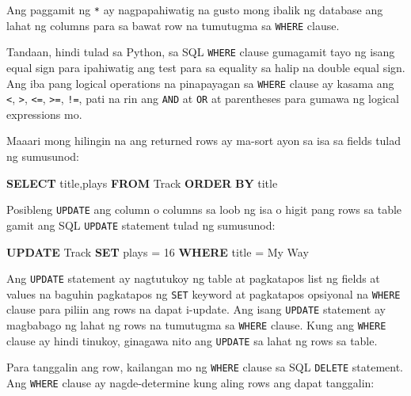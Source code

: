 \documentclass[10pt,]{book}
\newenvironment{Shaded}{}{}
\newcommand{\DecValTok}[1]{\textcolor[rgb]{0.25,0.63,0.44}{#1}}
\newcommand{\KeywordTok}[1]{\textcolor[rgb]{0.00,0.44,0.13}{\textbf{#1}}}
\newcommand{\NormalTok}[1]{#1}
\newcommand{\OperatorTok}[1]{\textcolor[rgb]{0.40,0.40,0.40}{#1}}
\newcommand{\StringTok}[1]{\textcolor[rgb]{0.25,0.44,0.63}{#1}}
\begin{document}
Ang paggamit ng \texttt{*} ay nagpapahiwatig na gusto mong ibalik ng
database ang lahat ng columns para sa bawat row na tumutugma sa
\texttt{WHERE} clause.

Tandaan, hindi tulad sa Python, sa SQL \texttt{WHERE} clause gumagamit
tayo ng isang equal sign para ipahiwatig ang test para sa equality sa
halip na double equal sign. Ang iba pang logical operations na
pinapayagan sa \texttt{WHERE} clause ay kasama ang \texttt{\textless{}},
\texttt{\textgreater{}}, \texttt{\textless{}=},
\texttt{\textgreater{}=}, \texttt{!=}, pati na rin ang \texttt{AND} at
\texttt{OR} at parentheses para gumawa ng logical expressions mo.

Maaari mong hilingin na ang returned rows ay ma-sort ayon sa isa sa
fields tulad ng sumusunod:

\begin{Shaded}
\begin{Highlighting}[]
\KeywordTok{SELECT}\NormalTok{ title,plays }\KeywordTok{FROM}\NormalTok{ Track }\KeywordTok{ORDER} \KeywordTok{BY}\NormalTok{ title}
\end{Highlighting}
\end{Shaded}

Posibleng \texttt{UPDATE} ang column o columns sa loob ng isa o higit
pang rows sa table gamit ang SQL \texttt{UPDATE} statement tulad ng
sumusunod:

\begin{Shaded}
\begin{Highlighting}[]
\KeywordTok{UPDATE}\NormalTok{ Track }\KeywordTok{SET}\NormalTok{ plays }\OperatorTok{=} \DecValTok{16} \KeywordTok{WHERE}\NormalTok{ title }\OperatorTok{=} \StringTok{\textquotesingle{}My Way\textquotesingle{}}
\end{Highlighting}
\end{Shaded}

Ang \texttt{UPDATE} statement ay nagtutukoy ng table at pagkatapos list
ng fields at values na baguhin pagkatapos ng \texttt{SET} keyword at
pagkatapos opsiyonal na \texttt{WHERE} clause para piliin ang rows na
dapat i-update. Ang isang \texttt{UPDATE} statement ay magbabago ng
lahat ng rows na tumutugma sa \texttt{WHERE} clause. Kung ang
\texttt{WHERE} clause ay hindi tinukoy, ginagawa nito ang
\texttt{UPDATE} sa lahat ng rows sa table.

Para tanggalin ang row, kailangan mo ng \texttt{WHERE} clause sa SQL
\texttt{DELETE} statement. Ang \texttt{WHERE} clause ay nagde-determine
kung aling rows ang dapat tanggalin:
\end{document}

